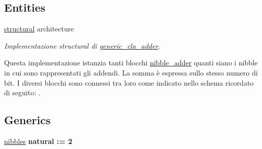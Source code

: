 \subsection*{Entities}
\begin{DoxyCompactItemize}
\item 
\hyperlink{classgeneric__cla__adder_1_1structural}{structural} architecture
\begin{DoxyCompactList}\small\item\em Implementazione structural di \hyperlink{classgeneric__cla__adder}{generic\+\_\+cla\+\_\+adder}.

Questa implementazione istanzia tanti blocchi \hyperlink{classnibble__adder}{nibble\+\_\+adder} quanti siano i nibble in cui sono rappresentati gli addendi. La somma è espressa sullo stesso numero di bit. I diversi blocchi sono connessi tra loro come indicato nello schema ricordato di seguito\+: . \end{DoxyCompactList}\end{DoxyCompactItemize}
\subsection*{Generics}
 \begin{DoxyCompactItemize}
\item 
\hyperlink{group___carry_loockahead_ga0b63b586531492d0fa882246cca071c1}{nibbles} {\bfseries {\bfseries \textcolor{vhdlchar}{natural}\textcolor{vhdlchar}{ }\textcolor{vhdlchar}{ }\textcolor{vhdlchar}{\+:}\textcolor{vhdlchar}{=}\textcolor{vhdlchar}{ }\textcolor{vhdlchar}{ } \textcolor{vhdldigit}{2} \textcolor{vhdlchar}{ }}}
\end{DoxyCompactItemize}
